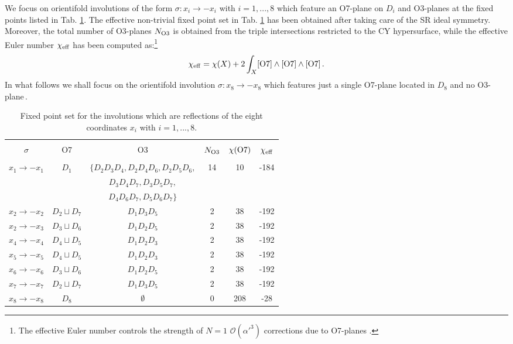 \documentclass[11pt,a4paper]{article}
\newcommand{\be}{\begin{equation}}
\newcommand{\ee}{\end{equation}}
\newcommand{\mc}{\mathcal}
\begin{document}
We focus on orientifold involutions of the form $\sigma: x_i \to - x_i$ with $i = 1, ...,8$  which feature an O7-plane on $D_i$ and O3-planes at the fixed points listed in Tab. \ref{FixedPointsA}. The effective non-trivial fixed point set in Tab. \ref{FixedPointsA} has been obtained after taking care of
the SR ideal symmetry. Moreover, the total number of O3-planes $N_{\rm O3}$ is obtained from the triple intersections restricted to the CY hypersurface, while the effective Euler number $\chi_{\rm eff}$ has been computed as:\footnote{The effective Euler number controls the strength of $N=1$ $\mc{O}(\alpha'^3)$ corrections due to O7-planes \cite{Minasian:2015bxa}.} 
\be
\chi_{\rm eff} = \chi(X) +2\int_X [{\rm O7}] \wedge [{\rm O7}] \wedge [{\rm O7}]\,.
\label{chieff}
\ee
In what follows we shall focus on the orientifold involution $\sigma: x_8\rightarrow-x_8$ which features just a single O7-plane located in $D_8$ and no O3-plane\,.
\begin{table}[H]
  \centering
 \begin{tabular}{|c|c|c|c|c|c|}
\hline
&  &  &  &  &  \\
$\sigma$ & O7  & O3  & $N_{{\rm O3}}$  & $\chi({\rm O7})$  & $\chi_{\rm eff}$       \\
&  &  &  &  &  \\
\hline
\hline
$x_1 \to -x_1$ &  $D_1$ & $\{D_2 D_3 D_4, D_2 D_4 D_6, D_2 D_5 D_6, $ & 14 & 10 & -184  \\
&  &  $D_3 D_4 D_7, D_3 D_5 D_7,$   &  &  &  \\
&  &  $D_4 D_6 D_7, D_5 D_6 D_7 \}$ &  &  &  \\
$x_2 \to -x_2$ &  $D_2\sqcup D_7$ & $D_1 D_3 D_5$ & 2 & 38 & -192  \\
$x_2 \to -x_3$ &  $D_3\sqcup D_6$ & $D_1 D_2 D_5$ & 2 & 38 & -192  \\
$x_4 \to -x_4$ &  $D_4\sqcup D_5$ & $D_1 D_2 D_3$ & 2 & 38 & -192  \\
$x_5 \to -x_5$ &  $D_4\sqcup D_5$ & $D_1 D_2 D_3$ & 2 & 38 & -192  \\
$x_6 \to -x_6$ &  $D_3\sqcup D_6$ & $D_1 D_2 D_5$ & 2 & 38 & -192  \\
$x_7 \to -x_7$ &  $D_2\sqcup D_7$ & $D_1 D_3 D_5$ & 2 & 38 & -192  \\
$x_8 \to -x_8$ &  $D_8$ & $\emptyset$ & 0 & 208 & -28  \\
\hline
\end{tabular}
\caption{Fixed point set for the involutions which are reflections of the eight coordinates $x_i$ with $i=1,...,8$.} 
\label{FixedPointsA} 
\end{table}
\end{document}
